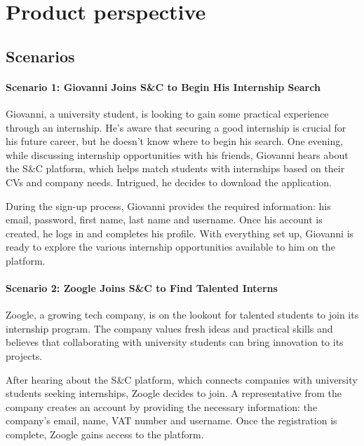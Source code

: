 \section{Product perspective}
\label{sec:product_perspesctive}%

\subsection{Scenarios}
\label{subsec:scenarios}%

\paragraph{Scenario 1: Giovanni Joins S\&C to Begin His Internship Search}

Giovanni, a university student, is looking to gain some practical
experience through an internship. He's aware that securing a good
internship is crucial for his future career, but he
doesn't know where to begin his search. One evening,
while discussing internship opportunities with his friends, Giovanni
hears about the S\&C platform, which helps match students with
internships based on their CVs and company needs. Intrigued, he decides
to download the application.

During the sign-up process, Giovanni provides the required information:
his email, password, first name, last name and username. Once his
account is created, he logs in and completes his profile. With
everything set up, Giovanni is ready to explore the various internship
opportunities available to him on the platform.


\paragraph{Scenario 2: Zoogle Joins S\&C to Find Talented Interns}

Zoogle, a growing tech company, is on the lookout for talented students
to join its internship program. The company values fresh ideas and
practical skills and believes that collaborating with university
students can bring innovation to its projects.

After hearing about the S\&C platform, which connects companies with
university students seeking internships, Zoogle decides to join. A
representative from the company creates an account by providing the
necessary information: the company's email, name, VAT number and username.
Once the registration is complete, Zoogle gains access to the platform.


